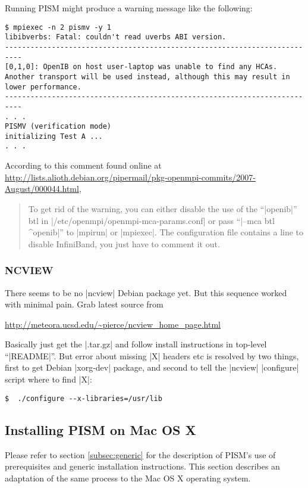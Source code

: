 \documentclass[11pt,final]{amsart}
\begin{document}
Running PISM might produce a warning message like the following:
\begin{verbatim}
$ mpiexec -n 2 pismv -y 1
libibverbs: Fatal: couldn't read uverbs ABI version.
--------------------------------------------------------------------------
[0,1,0]: OpenIB on host user-laptop was unable to find any HCAs.
Another transport will be used instead, although this may result in 
lower performance.
--------------------------------------------------------------------------
. . .
PISMV (verification mode)
initializing Test A ...
. . .
\end{verbatim}
According to this comment found online at \url{http://lists.alioth.debian.org/pipermail/pkg-openmpi-commits/2007-August/000044.html},
\begin{quote}
   To get rid of the warning, you can either disable the use of the ``|openib|'' btl
   in |/etc/openmpi/openmpi-mca-params.conf| or pass ``|--mca btl ^openib|'' to |mpirun|
   or |mpiexec|.  The configuration file contains a line to disable InfiniBand, you
   just have to comment it out.
\end{quote}
\bigskip

\subsubsection*{NCVIEW}  There seems to be no |ncview| Debian package
yet.  But this sequence worked with minimal pain.  Grab latest source from
\begin{center}
  \url{http://meteora.ucsd.edu/~pierce/ncview_home_page.html}
\end{center}
Basically just get the |.tar.gz| and follow install instructions in top-level ``|README|''.  But error about missing |X| headers etc is resolved by two things, first to get Debian |xorg-dev| package, and second to tell the |ncview| |configure| script where to find |X|:
\begin{verbatim}
$  ./configure --x-libraries=/usr/lib
\end{verbatim}



\clearpage
\subsection{Installing PISM on Mac OS X}  \label{subsec:macosx}

Please refer to section \ref{subsec:generic} for the description of PISM's use of prerequisites and generic installation
instructions. This section describes an adaptation of the same process to the Mac OS X operating system.
\end{document}
